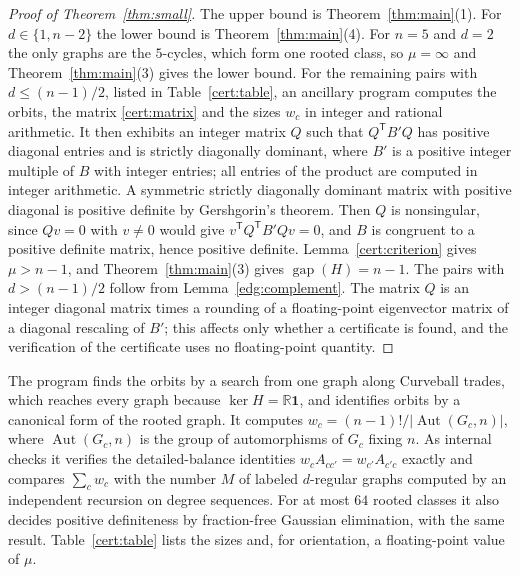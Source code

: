 \begin{proof}[Proof of Theorem~\ref{thm:small}]
The upper bound is Theorem~\ref{thm:main}(1). For $d\in\{1,n-2\}$ the lower
bound is Theorem~\ref{thm:main}(4). For $n=5$ and $d=2$ the only graphs are
the $5$-cycles, which form one rooted class, so $\mu=\infty$ and
Theorem~\ref{thm:main}(3) gives the lower bound.
For the remaining pairs with $d\le(n-1)/2$, listed in
Table~\ref{cert:table}, an ancillary program computes the orbits, the
matrix \eqref{cert:matrix} and the sizes $w_c$ in integer and rational
arithmetic. It then exhibits an integer matrix $Q$ such that
$Q^{\mathsf T}B'Q$ has positive diagonal entries and is strictly diagonally
dominant, where $B'$ is a positive integer multiple of $B$ with integer
entries; all entries of the product are computed in integer arithmetic. A
symmetric strictly diagonally dominant matrix with positive diagonal is
positive definite by Gershgorin's theorem. Then $Q$ is nonsingular, since
$Qv=0$ with $v\ne0$ would give $v^{\mathsf T}Q^{\mathsf T}B'Qv=0$, and $B$
is congruent to a positive definite matrix, hence positive definite.
Lemma~\ref{cert:criterion} gives $\mu>n-1$, and
Theorem~\ref{thm:main}(3) gives $\operatorname{gap}(H)=n-1$. The pairs with
$d>(n-1)/2$ follow from Lemma~\ref{edg:complement}. The matrix $Q$ is an integer diagonal matrix times a rounding of a
floating-point eigenvector matrix of a diagonal rescaling of $B'$; this
affects
only whether a certificate is found, and the verification of the certificate
uses no floating-point quantity.
\end{proof}

The program finds the orbits by a search from one graph along Curveball
trades, which reaches every graph because $\ker H=\mathbb R\mathbf1$, and
identifies orbits by a canonical form of the rooted graph. It computes
$w_c=(n-1)!/|\operatorname{Aut}(G_c,n)|$, where $\operatorname{Aut}(G_c,n)$ is
the group of automorphisms of $G_c$ fixing $n$. As internal checks it
verifies the detailed-balance identities $w_cA_{cc'}=w_{c'}A_{c'c}$ exactly
and compares $\sum_cw_c$ with the number $M$ of labeled $d$-regular graphs
computed by an independent recursion on degree sequences. For at most $64$
rooted classes it also decides positive definiteness by fraction-free
Gaussian elimination, with the same result.
Table~\ref{cert:table} lists the sizes and, for orientation, a floating-point
value of $\mu$.

